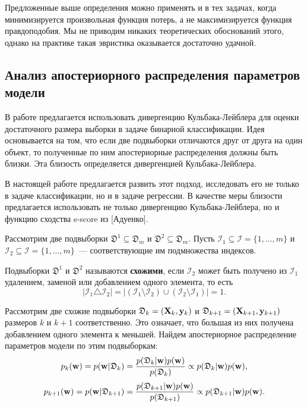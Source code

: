 Предложенные выше определения можно применять и в тех задачах, когда минимизируется произвольная функция потерь, а не максимизируется функция правдоподобия. Мы не приводим никаких теоретических обоснований этого, однако на практике такая эвристика оказывается достаточно удачной.

\subsection{Анализ апостериорного распределения параметров модели}

В работе \citep{MOTRENKO2014743} предлагается использовать дивергенцию Кульбака-Лейблера для оценки достаточного размера выборки в задаче бинарной классификации. Идея основывается на том, что если две подвыборки отличаются друг от друга на один объект, то полученные по ним апостериорные распределения должны быть близки. Эта близость определяется дивергенцией Кульбака-Лейблера. 

В настоящей работе предлагается развить этот подход, исследовать его не только в задаче классификации, но и в задаче регрессии. В качестве меры близости предлагается использовать не только дивергенцию Кульбака-Лейблера, но и функцию сходства s-score из [Адуенко].

Рассмотрим две подвыборки $\mathfrak{D}^1 \subseteq \mathfrak{D}_m$ и $\mathfrak{D}^2 \subseteq \mathfrak{D}_m$. Пусть $\mathcal{I}_1 \subseteq \mathcal{I} = \{ 1, \ldots, m \}$ и $\mathcal{I}_2 \subseteq \mathcal{I} = \{ 1, \ldots, m \}$~--- соответствующие им подмножества индексов.

\begin{definition}
    Подвыборки $\mathfrak{D}^1$ и $\mathfrak{D}^2$ называются \textbf{схожими}, если $\mathcal{I}_2$ может быть получено из $\mathcal{I}_1$ удалением, заменой или добавлением одного элемента, то есть $$ \left| \mathcal{I}_1 \triangle \mathcal{I}_2 \right| = \left| \left( \mathcal{I}_1 \setminus \mathcal{I}_2 \right) \cup \left( \mathcal{I}_2 \setminus \mathcal{I}_1 \right) \right| = 1. $$
\end{definition}

Рассмотрим две схожие подвыборки $\mathfrak{D}_k = (\mathbf{X}_k, \mathbf{y}_k)$ и $\mathfrak{D}_{k+1} = (\mathbf{X}_{k+1}, \mathbf{y}_{k+1})$ размеров $k$ и $k+1$ соответственно. Это означает, что большая из них получена добавлением одного элемента к меньшей. Найдем апостериорное распределение параметров модели по этим подвыборкам:
\[ p_k(\mathbf{w}) = p(\mathbf{w} | \mathfrak{D}_k) = \dfrac{p(\mathfrak{D}_k | \mathbf{w}) p(\mathbf{w})}{p(\mathfrak{D}_k)} \propto p(\mathfrak{D}_k | \mathbf{w}) p(\mathbf{w}), \]
\[ p_{k+1}(\mathbf{w}) = p(\mathbf{w} | \mathfrak{D}_{k+1}) = \dfrac{p(\mathfrak{D}_{k+1} | \mathbf{w}) p(\mathbf{w})}{p(\mathfrak{D}_{k+1})} \propto p(\mathfrak{D}_{k+1} | \mathbf{w}) p(\mathbf{w}). \]

